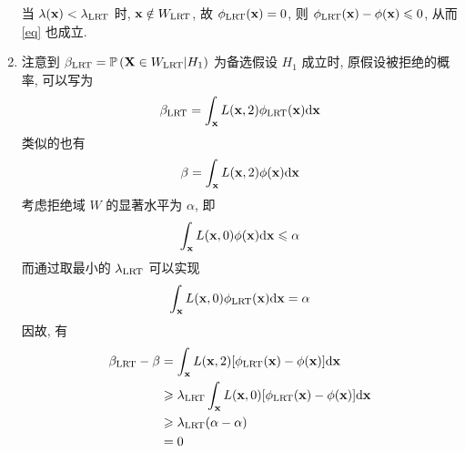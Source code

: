 \documentclass[8pt]{article}
\theoremstyle{compact}
\def\le{\leqslant}
\def\ge{\geqslant}
\def\P#1{\mathbb{P}\left({#1}\right)}
\begin{document}
\begin{enumerate}
	当 $\lambda(\textbf x) < \lambda_{\text{LRT}}$ 时, $\textbf x \notin W_{\text{LRT}}$, 故 $\phi_{\text{LRT}}(\mathbf x) = 0$, 则 $\phi_{\LRT}(\mathbf x) - \phi(\mathbf x) \le 0$, 从而 \cref{eq} 也成立.

	\item 注意到 $\beta_{\LRT} = \P{\mathbf X \in W_{\LRT} | H_1}$ 为备选假设 $H_1$ 成立时, 原假设被拒绝的概率, 可以写为 $$\beta_{\text{LRT}} = \int_{\mathbf x}L(\mathbf x, 2) \phi_{\text{LRT}}(\mathbf x)\text d\mathbf x$$ 类似的也有 $$\beta = \int_{\mathbf x}L(\mathbf x, 2) \phi(\mathbf x)\text d\mathbf x$$ 考虑拒绝域 $W$ 的显著水平为 $\alpha$, 即 $$\int_{\mathbf x}L(\mathbf x, 0)\phi(\mathbf x)\text d\mathbf x \le \alpha$$ 而通过取最小的 $\lambda_{\text{LRT}}$ 可以实现 $$\int_{\mathbf x}L(\mathbf x, 0)\phi_{\text{LRT}}(\mathbf x)\text d\mathbf x = \alpha$$ 因故, 有 \begin{align*}
		\begin{split}
			\beta_{\LRT} - \beta &= \int_{\mathbf x}L(\mathbf x, 2)[\phi_{\LRT}(\mathbf x) - \phi(\mathbf x)]\text d \mathbf x \\
			&\ge \lambda_{\LRT}\int_{\mathbf x}L(\mathbf x, 0)[\phi_{\LRT}(\mathbf x) - \phi(\mathbf x)]\text d \mathbf x \\
			&\ge \lambda_{\LRT}(\alpha - \alpha) \\
			&= 0
		\end{split}
	\end{align*}

\end{enumerate}
\end{document}
